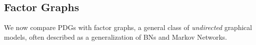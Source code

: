 \documentclass{article}
\theoremstyle{plain}
\theoremstyle{definition}
\theoremstyle{remark}
\numberwithin{equation}{section}
\begin{document}
	
	\subsection{Factor Graphs} \label{sec:factor-graphs}


	
	
	We now compare PDGs with factor graphs, a general class of \emph{undirected} graphical models, often described as a generalization of BNs and Markov Networks.
	
\end{document}
